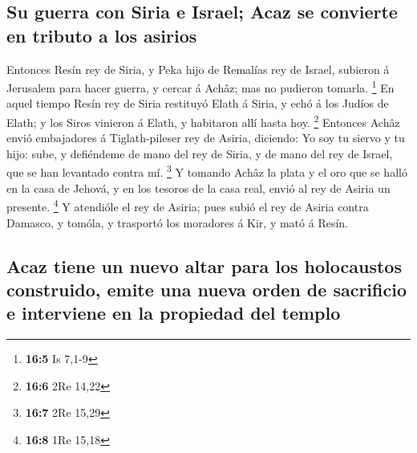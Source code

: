 \hypertarget{su-guerra-con-siria-e-israel-acaz-se-convierte-en-tributo-a-los-asirios}{%
\subsection{Su guerra con Siria e Israel; Acaz se convierte en tributo a
los
asirios}\label{su-guerra-con-siria-e-israel-acaz-se-convierte-en-tributo-a-los-asirios}}

 Entonces Resín rey de Siria, y Peka hijo de Remalías rey
de Israel, subieron á Jerusalem para hacer guerra, y cercar á Achâz; mas
no pudieron tomarla. \footnote{\textbf{16:5} Is 7,1-9}  En
aquel tiempo Resín rey de Siria restituyó Elath á Siria, y echó á los
Judíos de Elath; y los Siros vinieron á Elath, y habitaron allí hasta
hoy. \footnote{\textbf{16:6} 2Re 14,22}  Entonces Achâz
envió embajadores á Tiglath-pileser rey de Asiria, diciendo: Yo soy tu
siervo y tu hijo: sube, y defiéndeme de mano del rey de Siria, y de mano
del rey de Israel, que se han levantado contra mí. \footnote{\textbf{16:7}
  2Re 15,29}  Y tomando Achâz la plata y el oro que se
halló en la casa de Jehová, y en los tesoros de la casa real, envió al
rey de Asiria un presente. \footnote{\textbf{16:8} 1Re 15,18}
 Y atendióle el rey de Asiria; pues subió el rey de Asiria
contra Damasco, y tomóla, y trasportó los moradores á Kir, y mató á
Resín.

\hypertarget{acaz-tiene-un-nuevo-altar-para-los-holocaustos-construido-emite-una-nueva-orden-de-sacrificio-e-interviene-en-la-propiedad-del-templo}{%
\subsection{Acaz tiene un nuevo altar para los holocaustos construido,
emite una nueva orden de sacrificio e interviene en la propiedad del
templo}\label{acaz-tiene-un-nuevo-altar-para-los-holocaustos-construido-emite-una-nueva-orden-de-sacrificio-e-interviene-en-la-propiedad-del-templo}}

